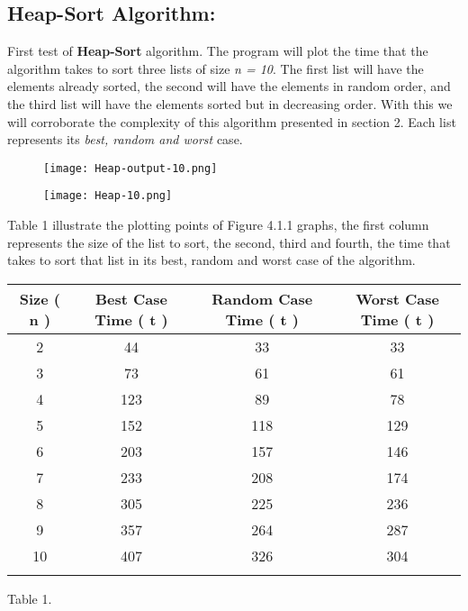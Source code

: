 \subsection{Heap-Sort Algorithm:}

First test of {\bfseries Heap-Sort} algorithm. The program will plot the time that the algorithm takes to sort three lists of size {\itshape n = 10}. The first list will have the elements already sorted, the second will have the elements in random order, and the third list will have the elements sorted but in decreasing order. With this we will corroborate the complexity of this algorithm presented in section 2. Each list represents its {\itshape best, random and worst} case. \hfill \break

\begin{figure}[H]
\texttt{[image: Heap-output-10.png]}
\centering \linebreak {}
\end{figure} 

\begin{figure}[H]
\texttt{[image: Heap-10.png]}
\centering \linebreak {}
\end{figure} \pagebreak

Table 1 illustrate the plotting points of Figure 4.1.1 graphs, the first column represents the size of the list to sort, the second, third and fourth, the time that takes to sort that list in its best, random and worst case of the algorithm. \hfill \break

{\small
\begin{center} 
\begin{tabular}[.5cm]{ c c c c } 
\toprule \toprule
\hspace {5px} Size ( n ) \hspace {5px} & \hspace {15px} Best Case Time ( t ) \hspace {15px} & \hspace {15px} Random Case Time ( t ) \hspace {15px} & \hspace {15px} Worst Case Time ( t ) \hspace {15px} \\ 
\midrule \midrule
2 & 44 & 33 & 33 \\ 
\cmidrule {1-4} 
3 & 73 & 61 & 61 \\ 
\cmidrule {1-4} 
4 & 123 & 89 & 78 \\ 
\cmidrule {1-4} 
5 & 152 & 118 & 129 \\ 
\cmidrule {1-4} 
6 & 203 & 157 & 146 \\ 
\cmidrule {1-4} 
7 & 233 & 208 & 174 \\ 
\cmidrule {1-4} 
8 & 305 & 225 & 236 \\ 
\cmidrule {1-4} 
9 & 357 & 264 & 287 \\ 
\cmidrule {1-4} 
10 & 407 & 326 & 304 \\ 
\bottomrule 
\linebreak 
\end{tabular} 
\linebreak \linebreak Table 1.
\end{center}}

